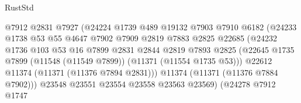 \begin{lexlean}{RustStd}
\begin{coremodule}
                                        @7912
                                        @2831
                                        @7927
                                        (@24224
                                          @1739
                                          @489
                                          @19132
                                          @7903
                                          @7910
                                          @6182
                                          (@24233
                                            @1738
                                            @53
                                            @55
                                            @4647
                                            @7902
                                            @7909
                                            @2819
                                            @7883
                                            @2825
                                            @22685
                                            (@24232
                                              @1736
                                              @103
                                              @53
                                              @16
                                              @7899
                                              @2831
                                              @2844
                                              @2819
                                              @7893
                                              @2825
                                              (@22645
                                                @1735
                                                @7899
                                                (@11548 (@11549 @7899))
                                                (@11371 (@11554 @1735 @53)))
                                              @22612
                                              @11374
                                              (@11371 (@11376 @7894 @2831)))
                                            @11374
                                            (@11371 (@11376 @7884 @7902)))
                                          @23548
                                          @23551
                                          @23554
                                          @23558
                                          @23563
                                          @23569)
                                        (@24278
                                          @7912
                                          @1747

\end{coremodule}
\end{lexlean}
